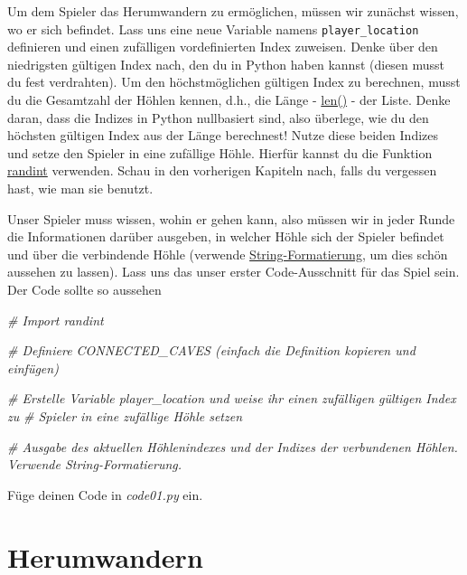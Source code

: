 \documentclass[
]{book}
\newenvironment{Shaded}{\begin{snugshade}}{\end{snugshade}}
\newcommand{\CommentTok}[1]{\textcolor[rgb]{0.56,0.35,0.01}{\textit{#1}}}
\begin{document}
Um dem Spieler das Herumwandern zu ermöglichen, müssen wir zunächst wissen, wo er sich befindet. Lass uns eine neue Variable namens \texttt{player\_location} definieren und einen zufälligen vordefinierten Index zuweisen. Denke über den niedrigsten gültigen Index nach, den du in Python haben kannst (diesen musst du fest verdrahten). Um den höchstmöglichen gültigen Index zu berechnen, musst du die Gesamtzahl der Höhlen kennen, d.h., die Länge - \href{https://docs.python.org/3/library/functions.html\#len}{len()} - der Liste. Denke daran, dass die Indizes in Python nullbasiert sind, also überlege, wie du den höchsten gültigen Index aus der Länge berechnest! Nutze diese beiden Indizes und setze den Spieler in eine zufällige Höhle. Hierfür kannst du die Funktion \href{https://docs.python.org/3/library/random.html\#random.randint}{randint} verwenden. Schau in den vorherigen Kapiteln nach, falls du vergessen hast, wie man sie benutzt.

Unser Spieler muss wissen, wohin er gehen kann, also müssen wir in jeder Runde die Informationen darüber ausgeben, in welcher Höhle sich der Spieler befindet und über die verbindende Höhle (verwende \protect\hyperlink{string-formatting}{String-Formatierung}, um dies schön aussehen zu lassen). Lass uns das unser erster Code-Ausschnitt für das Spiel sein. Der Code sollte so aussehen

\begin{Shaded}
\begin{Highlighting}[]
\CommentTok{\# Import randint}

\CommentTok{\# Definiere CONNECTED\_CAVES (einfach die Definition kopieren und einfügen)}

\CommentTok{\# Erstelle Variable \textasciigrave{}player\_location\textasciigrave{} und weise ihr einen zufälligen gültigen Index zu }
\CommentTok{\# Spieler in eine zufällige Höhle setzen}

\CommentTok{\# Ausgabe des aktuellen Höhlenindexes und der Indizes der verbundenen Höhlen. Verwende String{-}Formatierung.}
\end{Highlighting}
\end{Shaded}

Füge deinen Code in \emph{code01.py} ein.

\hypertarget{herumwandern}{%
\section{Herumwandern}\label{herumwandern}}
\end{document}
